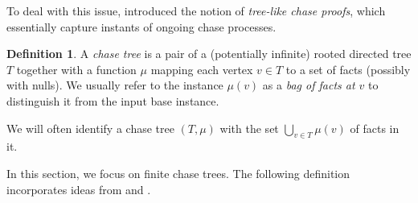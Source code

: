 \documentclass[12pt]{report}
\theoremstyle{plain}
\theoremstyle{definition}
\newtheorem{definition}[theorem]{Definition}
\begin{document}
To deal with this issue, \cite{benedikt_buron_germano_kappelmann_motik_2022} introduced the notion of \emph{tree-like chase proofs}, which essentially capture instants of ongoing chase processes.

\begin{definition}
  A \emph{chase tree} is a pair of a (potentially infinite) rooted directed tree $T$ together with a function $\mu$ mapping each vertex $v \in T$ to a set of facts (possibly with nulls). We usually refer to the instance $\mu(v)$ as a \emph{bag of facts at $v$} to distinguish it from the input base instance.
  
  We will often identify a chase tree $(T, \mu)$ with the set $\bigcup_{v \in T} \mu(v)$ of facts in it.
\end{definition}

In this section, we focus on finite chase trees. The following definition incorporates ideas from \cite{benedikt_buron_germano_kappelmann_motik_2022} and \cite{kappelmann_2019}.
\end{document}
